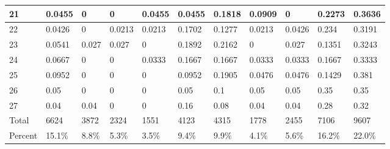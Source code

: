 \documentclass[12pt]{article}
\begin{document}
\begin{table} [h]
{\begin{tabular}{ | l | l | l | l | l | l | l | l | l | l | l |  }
21&0.0455&0&0&0.0455&0.0455&0.1818&0.0909&0&0.2273&0.3636 \\ \hline
22&0.0426&0&0.0213&0.0213&0.1702&0.1277&0.0213&0.0426&0.234&0.3191 \\ \hline
23&0.0541&0.027&0.027&0&0.1892&0.2162&0&0.027&0.1351&0.3243 \\ \hline
24&0.0667&0&0&0.0333&0.1667&0.1667&0.0333&0.0333&0.1667&0.3333 \\ \hline
25&0.0952&0&0&0&0.0952&0.1905&0.0476&0.0476&0.1429&0.381 \\ \hline
26&0.05&0&0&0&0.05&0.1&0.05&0.05&0.35&0.35 \\ \hline
27&0.04&0.04&0&0&0.16&0.08&0.04&0.04&0.28&0.32 \\ \hline
Total&6624&3872&2324&1551&4123&4315&1778&2455&7106&9607 \\ \hline
Percent&15.1\%&8.8\%&5.3\%&3.5\%&9.4\%&9.9\%&4.1\%&5.6\%&16.2\%&22.0\% \\ \hline
\end{tabular}
}
\end{table}
\end{document}

